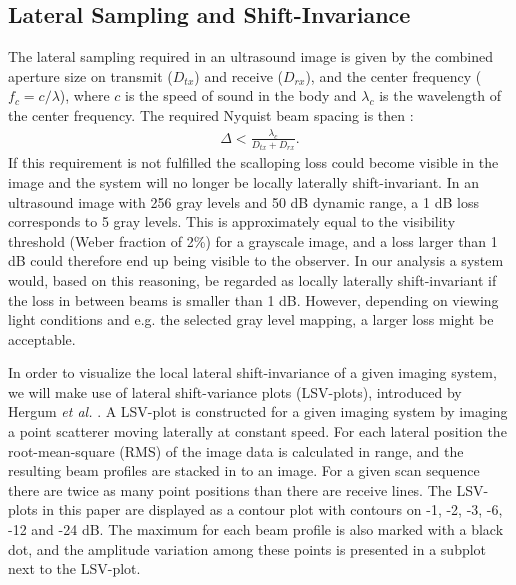 \documentclass[journal]{IEEEtran}
\newcommand{\mat}[1]{\mathbf{#1}}
\renewcommand{\vec}[1]{\mathbf{#1}}
\begin{document}

\subsection{Lateral Sampling and Shift-Invariance}

The lateral sampling required in an ultrasound image is given by the combined aperture size on transmit ($D_{tx}$) and receive ($D_{rx}$), and the center frequency ($f_c = c/\lambda$), where $c$ is the speed of sound in the body and $\lambda_c$ is the wavelength of the center frequency. The required Nyquist beam spacing is then \cite{Hergum2007}:
\begin{align}
\Delta < \frac{\lambda_c}{D_{tx} + D_{rx}}. \label{eq:resolution}
\end{align}
If this requirement is not fulfilled the scalloping loss could become visible in the image and the system will no longer be locally laterally shift-invariant. In an ultrasound image with 256 gray levels and 50 dB dynamic range, a 1 dB loss corresponds to 5 gray levels. This is approximately equal to the visibility threshold (Weber fraction of 2\%) for a grayscale image, and a loss larger than 1 dB could therefore end up being visible to the observer. In our analysis a system would, based on this reasoning, be regarded as locally laterally shift-invariant if the loss in between beams is smaller than 1 dB. However, depending on viewing light conditions and e.g. the selected gray level mapping, a larger loss might be acceptable.

In order to visualize the local lateral shift-invariance of a given imaging system, we will make use of lateral shift-variance plots (LSV-plots), introduced by Hergum \textit{et al.} \cite{Hergum2007}. A LSV-plot is constructed for a given imaging system by imaging a point scatterer moving laterally at constant speed. For each lateral position the root-mean-square (RMS) of the image data is calculated in range, and the resulting beam profiles are stacked in to an image. For a given scan sequence there are twice as many point positions than there are receive lines. The LSV-plots in this paper are displayed as a contour plot with contours on -1, -2, -3, -6, -12 and -24 dB. The maximum for each beam profile is also marked with a black dot, and the amplitude variation among these points is presented in a subplot next to the LSV-plot. 
\end{document}
